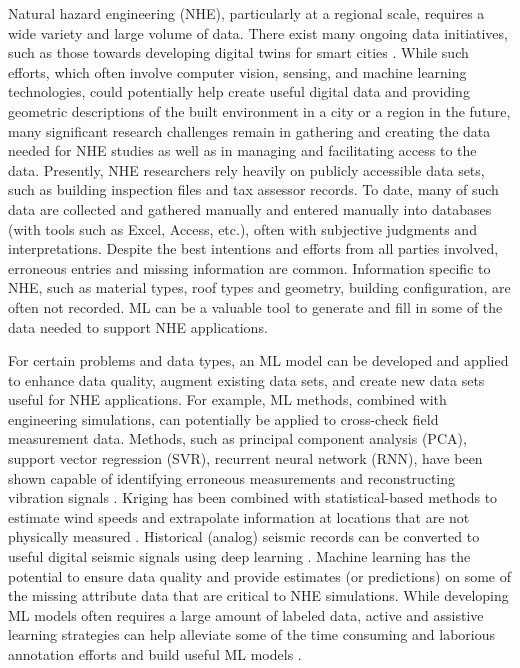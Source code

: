 Natural hazard engineering (NHE), particularly at a regional scale, requires a wide variety and large volume of data. There exist many ongoing data initiatives, such as those towards developing digital twins for smart cities \citep{nic2017, lehner2020digital, schrotter2020digital, day2019bentley}. While such efforts, which often involve computer vision, sensing, and machine learning technologies, could potentially help create useful digital data and providing geometric descriptions of the built environment in a city or a region in the future, many significant research challenges remain in gathering and creating the data needed for NHE studies as well as in managing and facilitating access to the data. Presently, NHE researchers rely heavily on publicly accessible data sets, such as building inspection files and tax assessor records. To date, many of such data are collected and gathered manually and entered manually into databases (with tools such as Excel, Access, etc.), often with subjective judgments and interpretations. Despite the best intentions and efforts from all parties involved, erroneous entries and missing information are common. Information specific to NHE, such as material types, roof types and geometry, building configuration, are often not recorded. ML can be a valuable tool to generate and fill in some of the data needed to support NHE applications. 

For certain problems and data types, an ML model can be developed and applied to enhance data quality, augment existing data sets, and create new data sets useful for NHE applications. For example, ML methods, combined with engineering simulations, can potentially be applied to cross-check field measurement data. Methods, such as principal component analysis (PCA), support vector regression (SVR), recurrent neural network (RNN), have been shown capable of identifying erroneous measurements and reconstructing vibration signals \citep{kerschen2005sensor,jeong2019sensor}. Kriging has been combined with statistical-based methods to estimate wind speeds and extrapolate information at locations that are not physically measured \citep{xu2014conditional}. Historical (analog) seismic records can be converted to useful digital seismic signals using deep learning \citep{wang2019seismology}. Machine learning has the potential to ensure data quality and provide estimates (or predictions) on some of the missing attribute data that are critical to NHE simulations. While developing ML models often requires a large amount of labeled data, active and assistive learning strategies can help alleviate some of the time consuming and laborious annotation efforts and build useful ML models \citep{joshi2009multiclass,wong2019assistive,yu2020largescale}. 

